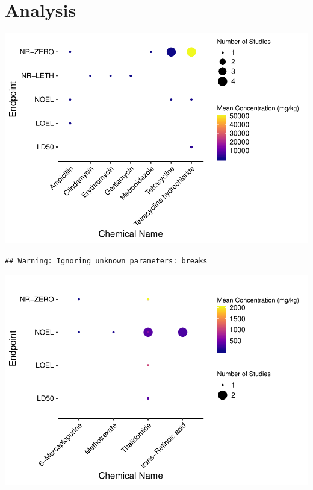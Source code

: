 \documentclass[12pt,]{article}
\begin{document}
\newpage

\section{Analysis}\label{analysis}

\includegraphics{Untitled_files/figure-latex/visualization 1-1.pdf}

\begin{verbatim}
## Warning: Ignoring unknown parameters: breaks
\end{verbatim}

\includegraphics{Untitled_files/figure-latex/visualization 2-1.pdf}
\end{document}
